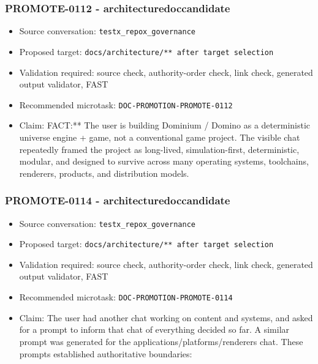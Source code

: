 \documentclass[9pt,a4paper,openany]{book}
\begin{document}
\subsubsection{PROMOTE-0112 - architecturedoccandidate}

\begin{itemize}
\item Source conversation: \texttt{testx\_\allowbreak{}repox\_\allowbreak{}governance}
\item Proposed target: \texttt{docs/\allowbreak{}architecture/\allowbreak{}** after target selection}
\item Validation required: source check, authority-\allowbreak{}order check, link check, generated output validator, FAST
\item Recommended microtask: \texttt{DOC-\allowbreak{}PROMOTION-\allowbreak{}PROMOTE-\allowbreak{}0112}
\item Claim: FACT:** The user is building Dominium /\allowbreak{} Domino as a deterministic universe engine + game, not a conventional game project.\allowbreak{} The visible chat repeatedly framed the project as long-\allowbreak{}lived, simulation-\allowbreak{}first, deterministic, modular, and designed to survive across many operating systems, toolchains, renderers, products, and distribution models.\allowbreak{}
\end{itemize}

\subsubsection{PROMOTE-0114 - architecturedoccandidate}

\begin{itemize}
\item Source conversation: \texttt{testx\_\allowbreak{}repox\_\allowbreak{}governance}
\item Proposed target: \texttt{docs/\allowbreak{}architecture/\allowbreak{}** after target selection}
\item Validation required: source check, authority-\allowbreak{}order check, link check, generated output validator, FAST
\item Recommended microtask: \texttt{DOC-\allowbreak{}PROMOTION-\allowbreak{}PROMOTE-\allowbreak{}0114}
\item Claim: The user had another chat working on content and systems, and asked for a prompt to inform that chat of everything decided so far.\allowbreak{} A similar prompt was generated for the applications/\allowbreak{}platforms/\allowbreak{}renderers chat.\allowbreak{} These prompts established authoritative boundaries:
\end{itemize}
\end{document}
